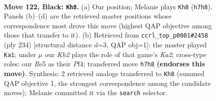 \documentclass[11pt]{article}
\begin{document}
\begin{figure}[p]\centering
\begin{subfigure}{0.46\textwidth}\centering
\resizebox{\linewidth}{!}{%
\newchessgame
\chessboard[
  setfen={8/5K1k/8/4r3/8/8/8/8 b - - 29 122},
  showmover=false,
  pgfstyle=straightmove, color=movearrow, markmove={h7-h8}
]}
\caption{}
\end{subfigure}\hfill
\begin{subfigure}{0.46\textwidth}\centering
\resizebox{\linewidth}{!}{%
\newchessgame
\chessboard[
  setfen={8/8/8/8/1k3P2/8/K7/8 w - - 6 118},
  showmover=false,
  pgfstyle=straightmove, color=movearrow, markmove={a2-a1}
]}
\caption{}
\end{subfigure}
\\[4pt]

\caption{\textbf{Move 122, Black: \texttt{Kh8}.} (a) Our position; Melanie plays \texttt{Kh8} (\texttt{h7h8}). Panels (b)--(d) are the retrieved master positions whose correspondence most drove this move (highest QAP objective among those that transfer to it). (b) Retrieved from \texttt{ccrl\_top\_p0001\#2458} (ply 234) [structural distance $d$=3, QAP obj=1]: the master played \texttt{Ka1}; under $\mu$ our \emph{Kh2} plays the role of that game's \emph{Ka2}; cross-type roles: our \emph{R}e5 as their \emph{P}f4; transferred move \texttt{h7h8} \textbf{(endorses this move)}. Synthesis: 2 retrieved analogs transferred to \texttt{Kh8} (summed QAP objective 1, the strongest correspondence among the candidate moves); Melanie committed it via the \texttt{search} selector.}
\label{fig:thought-m243}
\end{figure}

\clearpage
\end{document}
